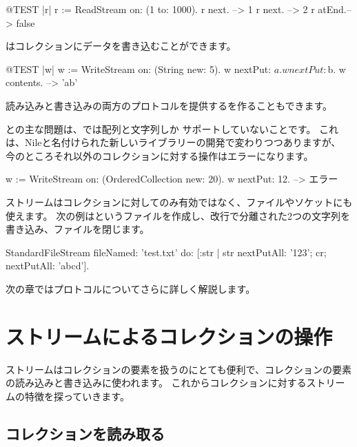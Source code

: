 \documentclass[a4paper,10pt,twoside]{book}
\begin{document}
\begin{code}{@TEST |r|}
r := ReadStream on: (1 to: 1000).
r next.   --> 1
r next.   --> 2
r atEnd.--> false
\end{code}

はコレクションにデータを書き込むことができます。


\begin{code}{@TEST |w|}
w := WriteStream on: (String new: 5).
w nextPut: $a.
w nextPut: $b.
w contents. -->  'ab'
\end{code}

読み込みと書き込みの両方のプロトコルを提供するを作ることもできます。

との主な問題は、\pharo では配列と文字列しか
サポートしていないことです。
これは、Nileと名付けられた新しいライブラリーの開発で変わりつつありますが、
今のところそれ以外のコレクションに対する操作はエラーになります。

\begin{code}{}
w := WriteStream on: (OrderedCollection new: 20).
w nextPut: 12. -->  エラー
\end{code}

ストリームはコレクションに対してのみ有効ではなく、ファイルやソケットにも使えます。
次の例はというファイルを作成し、改行で分離された2つの文字列を書き込み、ファイルを閉じます。

\begin{code}{}
StandardFileStream
  fileNamed: 'test.txt'
  do: [:str | str
                nextPutAll: '123';
                cr;
                nextPutAll: 'abcd'].
\end{code}

次の章ではプロトコルについてさらに詳しく解説します。

\section{ストリームによるコレクションの操作}

ストリームはコレクションの要素を扱うのにとても便利で、コレクションの要素の読み込みと書き込みに使われます。
これからコレクションに対するストリームの特徴を探っていきます。


\subsection{コレクションを読み取る}
\end{document}
